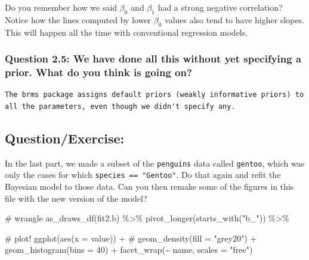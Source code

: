 \documentclass[
  letterpaper,
  DIV=11,
  numbers=noendperiod]{scrartcl}
\newenvironment{Shaded}{\begin{snugshade}}{\end{snugshade}}
\newcommand{\AttributeTok}[1]{\textcolor[rgb]{0.40,0.45,0.13}{#1}}
\newcommand{\CommentTok}[1]{\textcolor[rgb]{0.37,0.37,0.37}{#1}}
\newcommand{\DecValTok}[1]{\textcolor[rgb]{0.68,0.00,0.00}{#1}}
\newcommand{\FunctionTok}[1]{\textcolor[rgb]{0.28,0.35,0.67}{#1}}
\newcommand{\NormalTok}[1]{\textcolor[rgb]{0.00,0.23,0.31}{#1}}
\newcommand{\SpecialCharTok}[1]{\textcolor[rgb]{0.37,0.37,0.37}{#1}}
\newcommand{\StringTok}[1]{\textcolor[rgb]{0.13,0.47,0.30}{#1}}
\begin{document}
Do you remember how we said \(\beta_0\) and \(\beta_1\) had a strong
negative correlation? Notice how the lines computed by lower \(\beta_0\)
values also tend to have higher slopes. This will happen all the time
with conventional regression models.

\subsubsection{Question 2.5: We have done all this without yet
specifying a prior. What do you think is going
on?}\label{question-2.5-we-have-done-all-this-without-yet-specifying-a-prior.-what-do-you-think-is-going-on}

\begin{verbatim}
The brms package assigns default priors (weakly informative priors) to all the parameters, even though we didn't specify any.
\end{verbatim}

\subsection{Question/Exercise:}\label{questionexercise}

In the last part, we made a subset of the \texttt{penguins} data called
\texttt{gentoo}, which was only the cases for which
\texttt{species\ ==\ "Gentoo"}. Do that again and refit the Bayesian
model to those data. Can you then remake some of the figures in this
file with the new version of the model?

\begin{Shaded}
\begin{Highlighting}[]
\CommentTok{\# wrangle}
\FunctionTok{as\_draws\_df}\NormalTok{(fit2.b) }\SpecialCharTok{\%\textgreater{}\%} 
  \FunctionTok{pivot\_longer}\NormalTok{(}\FunctionTok{starts\_with}\NormalTok{(}\StringTok{"b\_"}\NormalTok{)) }\SpecialCharTok{\%\textgreater{}\%} 
  
  \CommentTok{\# plot!}
  \FunctionTok{ggplot}\NormalTok{(}\FunctionTok{aes}\NormalTok{(}\AttributeTok{x =}\NormalTok{ value)) }\SpecialCharTok{+} 
  \CommentTok{\# geom\_density(fill = "grey20") +}
  \FunctionTok{geom\_histogram}\NormalTok{(}\AttributeTok{bins =} \DecValTok{40}\NormalTok{) }\SpecialCharTok{+}
  \FunctionTok{facet\_wrap}\NormalTok{(}\SpecialCharTok{\textasciitilde{}}\NormalTok{ name, }\AttributeTok{scales =} \StringTok{"free"}\NormalTok{)}
\end{Highlighting}
\end{Shaded}
\end{document}
